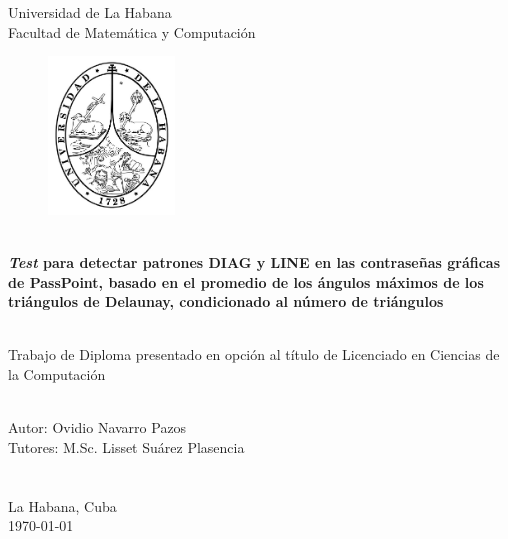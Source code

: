 \documentclass[12pt]{report}
\begin{document}
\begin{titlepage}
    \centering
    {\Huge {Universidad de La Habana}}\\[1cm]
    {\Huge {Facultad de Matemática y Computación }}\\[0.5cm]
 
    \begin{figure}[h]
    	\centering
    	\includegraphics[width=0.3\textwidth]{logoUH.png}
    	
    	
    \end{figure}
    {\noindent\hrulefill}\\[0.2cm]
    
    {\Large\textbf{{\textit{Test} para detectar patrones DIAG y LINE  en las contraseñas gráficas de PassPoint, basado en el promedio de los ángulos máximos de los triángulos de Delaunay, condicionado al número de triángulos }}}\\[0.1cm]
    {\noindent\hrulefill}\\[1.0cm]
    \begin{minipage}{0.8\textwidth}
    \begin{center}
    	{\Large Trabajo de Diploma presentado en opción al título de Licenciado en Ciencias de la Computación}
    	
    \end{center}
    \end{minipage}\\[1cm]
    
    
 
    
    {\Large {Autor: Ovidio Navarro Pazos}}\\[2cm]
   	{\Large {Tutores: M.Sc. Lisset Suárez Plasencia}}\\
   	\\
   	\\
   	[2.0cm]
   	
   	{\large{La Habana, Cuba}}\\
    {\large  \today}
\end{titlepage}
\end{document}
